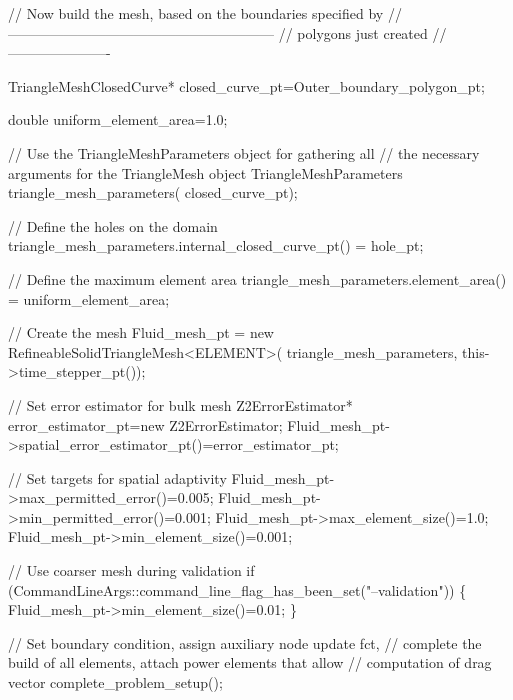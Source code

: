 \begin{DoxyCodeInclude}
 
 \textcolor{comment}{// Now build the mesh, based on the boundaries specified by}
 \textcolor{comment}{//---------------------------------------------------------}
 \textcolor{comment}{// polygons just created}
 \textcolor{comment}{//----------------------}

 TriangleMeshClosedCurve* closed\_curve\_pt=Outer\_boundary\_polygon\_pt;

 \textcolor{keywordtype}{double} uniform\_element\_area=1.0;

 \textcolor{comment}{// Use the TriangleMeshParameters object for gathering all}
 \textcolor{comment}{// the necessary arguments for the TriangleMesh object}
 TriangleMeshParameters triangle\_mesh\_parameters(
   closed\_curve\_pt);

 \textcolor{comment}{// Define the holes on the domain}
 triangle\_mesh\_parameters.internal\_closed\_curve\_pt() =
   hole\_pt;

 \textcolor{comment}{// Define the maximum element area}
 triangle\_mesh\_parameters.element\_area() =
   uniform\_element\_area;

 \textcolor{comment}{// Create the mesh}
 Fluid\_mesh\_pt =
   \textcolor{keyword}{new} RefineableSolidTriangleMesh<ELEMENT>(
     triangle\_mesh\_parameters, this->time\_stepper\_pt());

 \textcolor{comment}{// Set error estimator for bulk mesh}
 Z2ErrorEstimator* error\_estimator\_pt=\textcolor{keyword}{new} Z2ErrorEstimator;
 Fluid\_mesh\_pt->spatial\_error\_estimator\_pt()=error\_estimator\_pt;

 \textcolor{comment}{// Set targets for spatial adaptivity}
 Fluid\_mesh\_pt->max\_permitted\_error()=0.005;
 Fluid\_mesh\_pt->min\_permitted\_error()=0.001; 
 Fluid\_mesh\_pt->max\_element\_size()=1.0;
 Fluid\_mesh\_pt->min\_element\_size()=0.001; 

 \textcolor{comment}{// Use coarser mesh during validation}
 \textcolor{keywordflow}{if} (CommandLineArgs::command\_line\_flag\_has\_been\_set(\textcolor{stringliteral}{"--validation"}))
  \{
   Fluid\_mesh\_pt->min\_element\_size()=0.01; 
  \}

 \textcolor{comment}{// Set boundary condition, assign auxiliary node update fct,}
 \textcolor{comment}{// complete the build of all elements, attach power elements that allow}
 \textcolor{comment}{// computation of drag vector}
 complete\_problem\_setup();

\end{DoxyCodeInclude}


